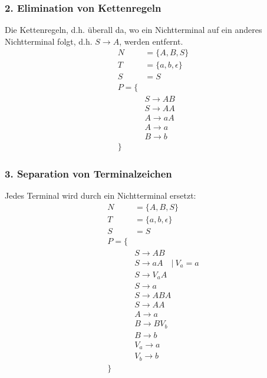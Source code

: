 \subsubsection{2. Elimination von Kettenregeln}
Die Kettenregeln, d.h. überall da, wo ein Nichtterminal auf ein anderes Nichtterminal folgt, d.h. $S\to A$, werden entfernt.
\begin{align*}
    N&=\{A,B,S\}\\
    T&=\{a,b,\epsilon\}\\
    S&=S\\
    P=\{\\
    &S\to AB\\
    &S\to AA\\
    &A\to aA\\
    &A\to a\\
    &B\to b\\
    \}
\end{align*}
\subsubsection{3. Separation von Terminalzeichen}
Jedes Terminal wird durch ein Nichtterminal ersetzt:
\begin{align*}
    N&=\{A,B,S\}\\
    T&=\{a,b,\epsilon\}\\
    S&=S\\
    P=\{\\
    &S\to AB\\
    &S\to aA \quad |\ V_a = a\\
    &S\to V_{a}A\\
    &S\to a\\
    &S\to ABA\\
    &S\to AA\\
    &A\to a\\
    &B\to BV_b\\
    &B\to b\\
    &V_a\to a\\
    &V_b\to b\\
    \}
\end{align*}
